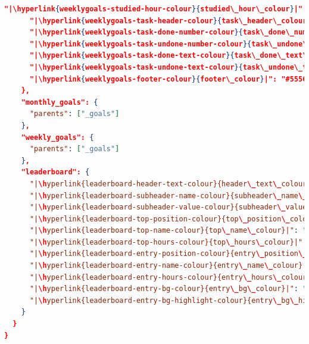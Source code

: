 \documentclass[a4paper, 10pt]{report}
\begin{document}
\begin{lstlisting}[language=json,firstnumber=1]
      "|\hyperlink{weeklygoals-studied-hour-colour}{studied\_hour\_colour}|": "#9A9FCC",
      "|\hyperlink{weeklygoals-task-header-colour}{task\_header\_colour}|": "#9A9FCC",
      "|\hyperlink{weeklygoals-task-done-number-colour}{task\_done\_number\_colour}|": "#7E6FB2",
      "|\hyperlink{weeklygoals-task-undone-number-colour}{task\_undone\_number\_colour}|": "#7E6FB2",
      "|\hyperlink{weeklygoals-task-done-text-colour}{task\_done\_text\_colour}|": "#515151",
      "|\hyperlink{weeklygoals-task-undone-text-colour}{task\_undone\_text\_colour}|": "#F5F6F7",
      "|\hyperlink{weeklygoals-footer-colour}{footer\_colour}|": "#555671"
    },
    "monthly_goals": {
      "parents": ["_goals"]
    },
    "weekly_goals": {
      "parents": ["_goals"]
    },
    "leaderboard": {
      "|\hyperlink{leaderboard-header-text-colour}{header\_text\_colour}|": "#9A9ECE",
      "|\hyperlink{leaderboard-subheader-name-colour}{subheader\_name\_colour}|": "#767372",
      "|\hyperlink{leaderboard-subheader-value-colour}{subheader\_value\_colour}|": "#767372",
      "|\hyperlink{leaderboard-top-position-colour}{top\_position\_colour}|": "#BBBBBB",
      "|\hyperlink{leaderboard-top-name-colour}{top\_name\_colour}|": "#9A9FCC",
      "|\hyperlink{leaderboard-top-hours-colour}{top\_hours\_colour}|": "#BBBBBB",
      "|\hyperlink{leaderboard-entry-position-colour}{entry\_position\_colour}|": "#BBBBBB",
      "|\hyperlink{leaderboard-entry-name-colour}{entry\_name\_colour}|": "#9A9FCC",
      "|\hyperlink{leaderboard-entry-hours-colour}{entry\_hours\_colour}|": "#BBBBBB",
      "|\hyperlink{leaderboard-entry-bg-colour}{entry\_bg\_colour}|": "#55568233",
      "|\hyperlink{leaderboard-entry-bg-highlight-colour}{entry\_bg\_highlight\_colour}|": "#55568273"
    }
  }
}
\end{lstlisting}
%
%
\end{document}

